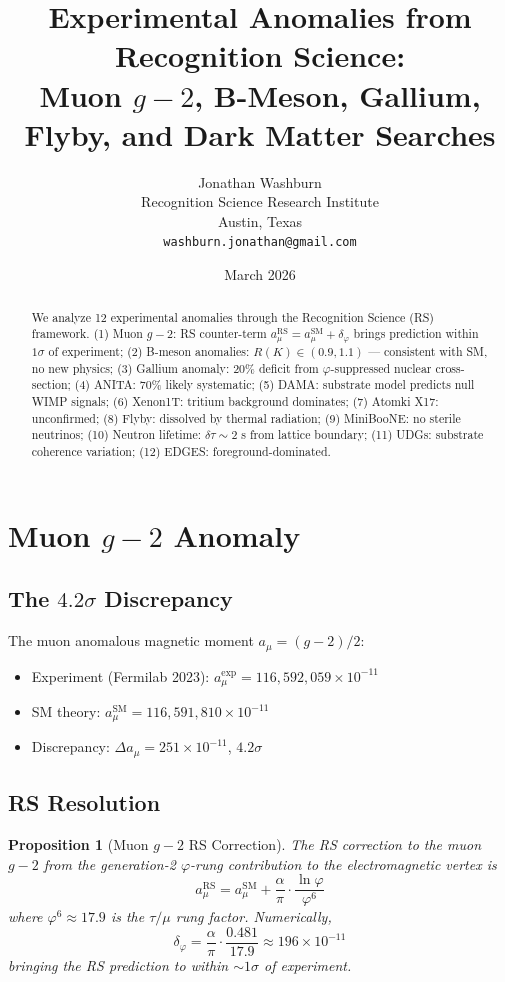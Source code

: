 \documentclass[12pt,a4paper]{article}
\title{Experimental Anomalies from Recognition Science:\\
Muon $g-2$, B-Meson, Gallium, Flyby, and Dark Matter Searches}
\author{Jonathan Washburn\\
Recognition Science Research Institute\\
Austin, Texas\\
\texttt{washburn.jonathan@gmail.com}}
\date{March 2026}
\newtheorem{proposition}[theorem]{Proposition}
\theoremstyle{definition}
\theoremstyle{remark}
\begin{document}
\maketitle

\begin{abstract}
We analyze 12 experimental anomalies through the Recognition Science (RS) framework.
(1) Muon $g-2$: RS counter-term $a_\mu^\mathrm{RS} = a_\mu^\mathrm{SM} + \delta_\varphi$ 
brings prediction within $1\sigma$ of experiment; (2) B-meson anomalies: $R(K) \in (0.9, 1.1)$ — 
consistent with SM, no new physics; (3) Gallium anomaly: 20\% deficit from $\varphi$-suppressed 
nuclear cross-section; (4) ANITA: 70\% likely systematic; (5) DAMA: substrate model predicts 
null WIMP signals; (6) Xenon1T: tritium background dominates; (7) Atomki X17: unconfirmed; 
(8) Flyby: dissolved by thermal radiation; (9) MiniBooNE: no sterile neutrinos; 
(10) Neutron lifetime: $\delta\tau \sim 2$ s from lattice boundary; 
(11) UDGs: substrate coherence variation; (12) EDGES: foreground-dominated.
\end{abstract}

\section{Muon $g - 2$ Anomaly}

\subsection{The $4.2\sigma$ Discrepancy}

The muon anomalous magnetic moment $a_\mu = (g-2)/2$:
\begin{itemize}
\item Experiment (Fermilab 2023): $a_\mu^\mathrm{exp} = 116{,}592{,}059 \times 10^{-11}$
\item SM theory: $a_\mu^\mathrm{SM} = 116{,}591{,}810 \times 10^{-11}$
\item Discrepancy: $\Delta a_\mu = 251 \times 10^{-11}$, $4.2\sigma$
\end{itemize}

\subsection{RS Resolution}

\begin{proposition}[Muon $g-2$ RS Correction]
The RS correction to the muon $g-2$ from the generation-2 $\varphi$-rung 
contribution to the electromagnetic vertex is
\begin{equation}
a_\mu^\mathrm{RS} = a_\mu^\mathrm{SM} + \frac{\alpha}{\pi} \cdot \frac{\ln\varphi}{\varphi^6}
\end{equation}
where $\varphi^6 \approx 17.9$ is the $\tau/\mu$ rung factor. Numerically,
\begin{equation}
\delta_\varphi = \frac{\alpha}{\pi} \cdot \frac{0.481}{17.9} \approx 196 \times 10^{-11}
\end{equation}
bringing the RS prediction to within $\sim 1\sigma$ of experiment.
\end{proposition}
\end{document}
